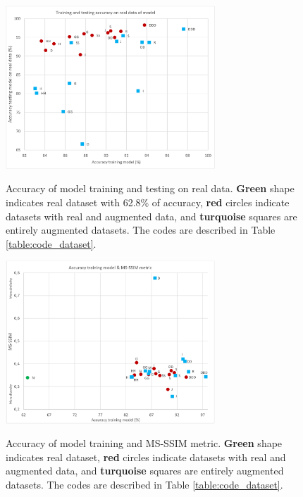 \documentclass[journal]{IEEEtran}
\begin{document}
\begin{figure}
\centering
{\includegraphics[width=0.7\textwidth,keepaspectratio]{img/entrenamiento_prueba.png}}
\caption{Accuracy of model training and testing on real data. \textcolor{dotgreen}{\textbf{Green}} shape indicates real dataset with 62.8\% of accuracy, \textcolor{dotred}{\textbf{red}} circles indicate datasets with real and augmented data, and \textcolor{dotsky}{\textbf{turquoise}} squares are entirely augmented datasets. The codes are described in Table \ref{table:code_dataset}.}
\label{fig:da_training_test}
\end{figure}

\begin{figure}
\centering
{\includegraphics[width=0.7\textwidth,keepaspectratio]{img/entrenamiento_msssim.png}}
\caption{Accuracy of model training and MS-SSIM metric. \textcolor{dotgreen}{\textbf{Green}} shape indicates real dataset, \textcolor{dotred}{\textbf{red}} circles indicate datasets with real and augmented data, and \textcolor{dotsky}{\textbf{turquoise}} squares are entirely augmented datasets. The codes are described in Table \ref{table:code_dataset}.
}
\label{fig:da_training_msssim}
\end{figure}
\end{document}
